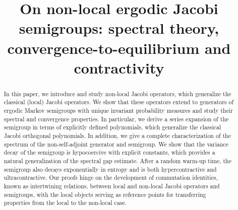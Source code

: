 \documentclass[JEP,XML,SOM,Unicode]{cedram}
\theoremstyle{plain}
\theoremstyle{definition}
\begin{document}
\frontmatter
\title[On non-local ergodic Jacobi semigroups]{On non-local ergodic Jacobi semigroups: spectral theory, convergence-to-equilibrium and contractivity}

\author[\initial{P.} \lastname{Cheridito}]{ }
\address{Department of Mathematics, ETH Zurich\\
Rämistrasse 101, 8092 Zurich, Switzerland}

\author[\initial{P.} \lastname{Patie}]{ }
\address{School of Operations Research and Information Engineering, Cornell University\\
Ithaca, NY 14853, USA}

\author[\initial{A.} \lastname{Srapionyan}]{ }
\address{Center for Applied Mathematics, Cornell University\\
Ithaca, NY 14853, USA}
\urladdr{}

\author[\initial{A.} \lastname{Vaidyanathan}]{ }
\address{Center for Applied Mathematics, Cornell University\\
Ithaca, NY 14853, USA}
\urladdr{}



\begin{abstract}
In this paper, we introduce and study non-local Jacobi operators, which generalize the classical (local) Jacobi operators. We show that these operators extend to generators of ergodic Markov semigroups with unique invariant probability measures and study their spectral and convergence properties. In particular, we derive a series expansion of the semigroup in terms of explicitly defined polynomials, which generalize the classical Jacobi orthogonal polynomials. In addition, we give a complete characterization of the spectrum of the non-self-adjoint generator and semigroup. We show that the variance decay of the semigroup is hypocoercive with explicit constants, which provides a natural generalization of the spectral gap estimate. After a random warm-up time, the semigroup also decays exponentially in entropy and is both hypercontractive and ultracontractive. Our proofs hinge on the development of commutation identities, known as intertwining relations, between local and non-local Jacobi operators and semigroups, with the local objects serving as reference points for transferring properties
from the local to the non-local case.
\end{abstract}
\end{document}
